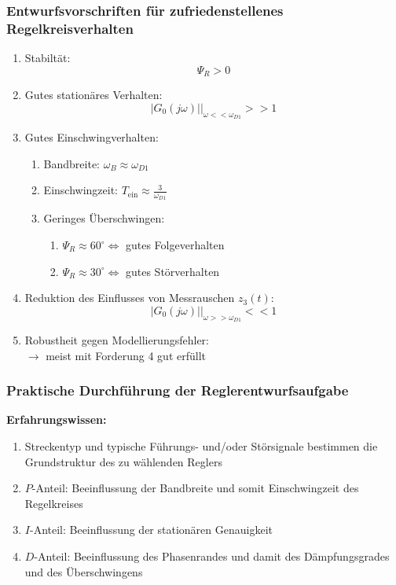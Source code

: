 \documentclass[a4paper,twocolumn,10pt]{article}
\begin{document}
\subsubsection{Entwurfsvorschriften für zufriedenstellenes Regelkreisverhalten}
\begin{enumerate}
\item Stabiltät:
\begin{equation*}
\Psi_R>0
\end{equation*}
\item Gutes stationäres Verhalten:
\begin{equation*}
\left.|G_0(j\omega)|\right|_{\omega<<\omega_{D1}}>>1
\end{equation*}
\item Gutes Einschwingverhalten:
\begin{enumerate}[label=]
\item Bandbreite: $\omega_B\approx\omega_{D1}$
\item Einschwingzeit: $T_{\text{ein}}\approx\frac{3}{\omega_{D1}}$
\item Geringes Überschwingen:
\begin{enumerate}[label=$\bullet$]
\item $\Psi_R\approx 60^{\circ}\Leftrightarrow$ gutes Folgeverhalten
\item $\Psi_R\approx 30^{\circ}\Leftrightarrow$ gutes Störverhalten
\end{enumerate}
\end{enumerate}
\item Reduktion des Einflusses von Messrauschen $z_3(t)$:
\begin{equation*}
\left.|G_0(j\omega)|\right|_{\omega>>\omega_{D1}}<<1
\end{equation*}
\item Robustheit gegen Modellierungsfehler:\\
$\rightarrow$ meist mit Forderung 4 gut erfüllt
\end{enumerate}

\subsubsection{Praktische Durchführung der Reglerentwurfsaufgabe}
\textbf{Erfahrungswissen:}
\begin{enumerate}[label=$\bullet$]
\item Streckentyp und typische Führungs- und/oder Störsignale bestimmen die Grundstruktur des zu wählenden Reglers
\item $P$-Anteil: Beeinflussung der Bandbreite und somit Einschwingzeit des Regelkreises
\item $I$-Anteil: Beeinflussung der stationären Genauigkeit
\item $D$-Anteil: Beeinflussung des Phasenrandes und damit des Dämpfungsgrades und des Überschwingens
\end{enumerate}
\end{document}

